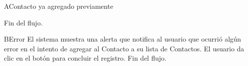 		\begin{UCtrayectoriaA}{A}{Contacto ya agregado previamente}
	
			\UCpaso[] Fin del flujo.
			
		\end{UCtrayectoriaA}

		
		\begin{UCtrayectoriaA}{B}{Error}
			\UCpaso El sistema muestra una alerta que notifica al usuario que ocurri\'o alg\'un error en el intento de agregar al Contacto a su lista de Contactos.
			\UCpaso[] El usuario da clic en el bot\'on  para concluir el registro.
			\UCpaso[] Fin del flujo.
		\end{UCtrayectoriaA}
		
		
		
				
